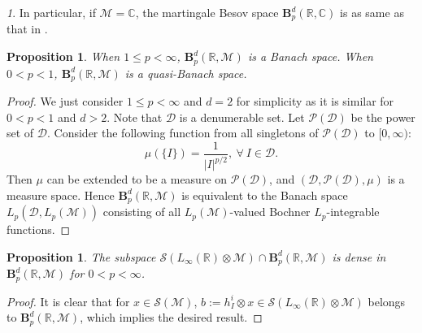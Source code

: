 \documentclass[oneside,english,a4wide]{amsart}
\numberwithin{equation}{section}
\numberwithin{figure}{section}
\theoremstyle{plain}
\theoremstyle{plain}
\newtheorem{proposition}[thm]{Proposition}
\theoremstyle{definition}
\theoremstyle{plain}
\theoremstyle{remark}
\newtheorem{rem}[thm]{\protect\remarkname}
\theoremstyle{definition}
\theoremstyle{remark}
\theoremstyle{definition}
\providecommand{\remarkname}{Remark}
\newcommand{\M}{{\mathcal M}}
\newcommand{\8}{\infty}
\begin{document}
	\begin{rem}
	In particular, if $\M=\mathbb{C}$, the martingale Besov space $\pmb{B}_p^d(\mathbb{R},\mathbb{C})$ is as same as that in \cite{CP}. 
\end{rem}

\begin{proposition}\label{prop2.100}
	When $1\leq p<\8$, $\pmb{B}_p^d(\mathbb{R},\M)$ is a Banach space. When $0<p<1$, $\pmb{B}_p^d(\mathbb{R},\M)$ is a quasi-Banach space.
\end{proposition}
\begin{proof}
	We just consider $1\leq p<\8$ and $d=2$ for simplicity as it is similar for $0<p<1$ and $d>2$. Note that $ \mathcal{D}$ is a denumerable set. Let $\mathcal{P}( \mathcal{D})$ be the power set of $ \mathcal{D}$. Consider the following function from all singletons of $\mathcal{P}( \mathcal{D})$ to $[0, \8)$:
	$$  \mu(\{I\})=\dfrac{1}{|I|^{p/2}}, \ \forall \ I\in  \mathcal{D}. $$
	Then $\mu$ can be extended to be a measure on $\mathcal{P}( \mathcal{D})$, and $(\mathcal{ D}, \mathcal{P}( \mathcal{D}), \mu)$ is a measure space. Hence ${\pmb{B}_p^d(\mathbb{R},\M)}$ is equivalent to the Banach space $L_p( \mathcal{ D}, L_p(\M))$ consisting of all $L_p(\M)$-valued Bochner $L_p$-integrable functions.
\end{proof}
\begin{proposition}
	 The subspace $\mathcal{S}(L_\8(\mathbb{R})\otimes \M) \cap \pmb{B}_p^d(\mathbb{R},\M)$ is dense in $\pmb{B}_p^d(\mathbb{R},\M)$ for $0<p<\8$.
\end{proposition}
\begin{proof}
	It is clear that for $x\in \mathcal{S}(\M)$, $b:=h_I^i\otimes x \in \mathcal{S}(L_\8(\mathbb{R})\otimes \M)$ belongs to $\pmb{B}_p^d(\mathbb{R},\M)$, which implies the desired result.
\end{proof}
\end{document}
